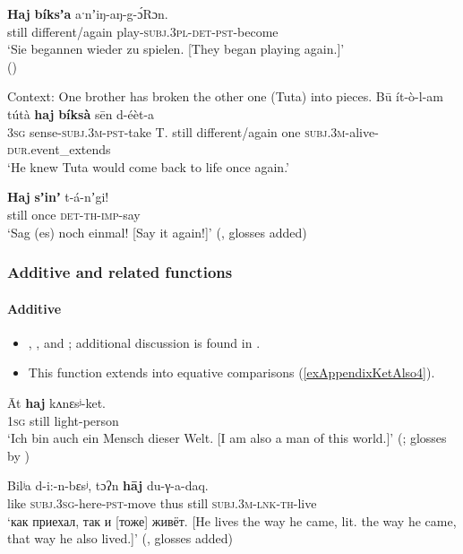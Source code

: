 \begin{exe}
	\ex\label{exAppendixKetIterativeIncrement1}
	\gll \textbf{Haj} \textbf{bíksʼa} aˑnʼiŋ-aŋ-g-ɔ́Rɔn.\\
	still different/again play-\textsc{subj}.3\textsc{pl}-\textsc{det}-\textsc{pst}-become\\
	\glt \lq Sie begannen wieder zu spielen. [They began playing again.]'
	\\(\cite[292]{Werner2002})
	
	\ex\label{exAppendixKetIterativeIncrement2}
	Context: One brother has broken the other one (Tuta) into pieces.
	\exi{}\gll Bū ít-ò-l-am tútà \textbf{haj} \textbf{bíksà} sēn d-éèt-a\\
	3\textsc{sg} sense-\textsc{subj}.3\textsc{m}-\textsc{pst}-take T. still different/again one \textsc{subj}.3\textsc{m}-alive-\textsc{dur}.event\_extends\\
	\glt \lq He knew Tuta would come back to life once again.' \parencite[94]{Vajda2004}
	
	\ex\label{exAppendixKetIterativeIncrement3}
	\gll \textbf{Haj} \textbf{sʼinʼ} t-á-nʼgi!\\
	still once \textsc{det}-\textsc{th}-\textsc{imp}-say\\
	\glt \lq Sag (es) noch einmal! [Say it again!]\rq{ }(\cite[292]{Werner2002}, glosses added)
\end{exe}

\subsubsection{Additive and related functions}
\paragraph{Additive}\label{appendixKetAdditive}
\begin{itemize}
	\sloppy
	\item \textcite[311]{Georg2007}, \textcite[177]{KotorovaNefedov2015}, \textcite[96]{Nefedov2015} and \textcite[292]{Werner2002}; additional discussion is found in \textcite[306–307]{vanBaar1997}.
	\item This function extends into equative comparisons (\ref{exAppendixKetAlso4}).
\end{itemize}

\begin{exe}
	\ex
	\gll Āt \textbf{haj} kʌnɛsʲ-ket.\\
	1\textsc{sg} still	light-person\\
	\glt \lq Ich bin auch ein Mensch dieser Welt. [I am also a man of this world.]\rq{ }(\cite[292]{Werner2002}; glosses by \cite[96]{Nefedov2015})
	
	\ex\label{exAppendixKetAlso4}
	\gll Bilʲa d-i:-n-bεsʲ, tɔʔn \textbf{hāj} du-γ-a-daq.\\
	like \textsc{subj}.3\textsc\textsc{sg}-here-\textsc{pst}-move thus still \textsc{subj}.3\textsc{m}-\textsc{lnk}-\textsc{th}-live\\
	\glt \lq как приехал, так и [тоже] живёт. [He lives the way he came, lit. the way he came, that way he also lived.]\rq{ }(\cite[177]{KotorovaNefedov2015}, glosses added)
\end{exe}

